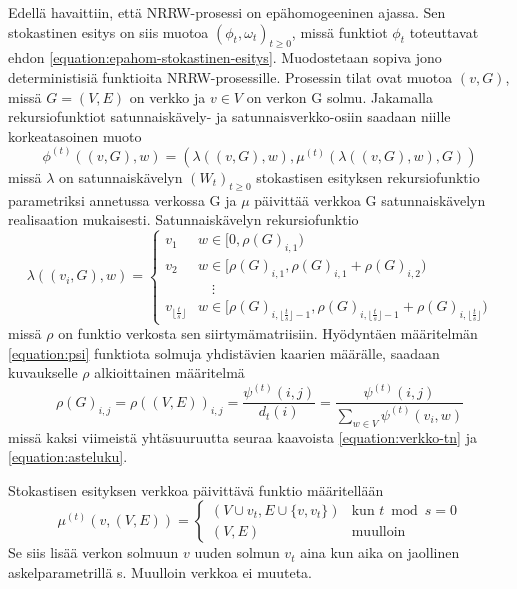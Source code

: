 \documentclass[finnish, 12pt, a4paper, sci, utf8, pdfa]{aaltothesis}
\begin{document}
Edellä havaittiin, että NRRW-prosessi on epähomogeeninen ajassa. Sen stokastinen esitys on siis muotoa \( (\phi_{t}, \omega_{t})_{t \geq 0} \), missä funktiot \( \phi_{t} \) toteuttavat ehdon \ref{equation:epahom-stokastinen-esitys}. Muodostetaan sopiva jono deterministisiä funktioita NRRW-prosessille. Prosessin tilat ovat muotoa \( (v, G) \), missä \( G = (V, E) \) on verkko ja \( v \in V \) on verkon G solmu. Jakamalla rekursiofunktiot satunnaiskävely- ja satunnaisverkko-osiin saadaan niille korkeatasoinen muoto
\begin{equation}
   \phi^{(t)} \left( (v, G), w \right) = \left( \lambda\left( (v, G), w \right), \mu^{(t)} \left( \lambda\left( (v, G), w \right), G \right) \right)
\end{equation}
missä \( \lambda \) on satunnaiskävelyn \( (W_{t})_{t \geq 0} \) stokastisen esityksen rekursiofunktio parametriksi annetussa verkossa G ja \( \mu \) päivittää verkkoa G satunnaiskävelyn realisaation mukaisesti. Satunnaiskävelyn rekursiofunktio
\begin{equation}
   \lambda \left( (v_{i}, G), w \right) = 
   \begin{cases}
      v_{1} & w \in [0, \rho(G)_{i,1}) \\
      v_{2} & w \in [\rho(G)_{i,1}, \rho(G)_{i,1} + \rho(G)_{i,2}) \\
            & \quad \vdots \\
      v_{\lfloor \frac{t}{s} \rfloor} & w \in [\rho(G)_{i,\lfloor \frac{t}{s} \rfloor - 1}, \rho(G)_{i,\lfloor \frac{t}{s} \rfloor - 1} + \rho(G)_{i,\lfloor \frac{t}{s} \rfloor}) 
   \end{cases}
\end{equation}
missä \( \rho \) on funktio verkosta sen siirtymämatriisiin. Hyödyntäen määritelmän \ref{equation:psi} funktiota solmuja yhdistävien kaarien määrälle, saadaan kuvaukselle \( \rho \) alkioittainen määritelmä
\begin{equation}
   \rho(G)_{i,j} = \rho\left( (V, E) \right)_{i,j} = \frac{\psi^{(t)}(i, j)}{d_{t}(i)} = \frac{\psi^{(t)}(i, j)}{\sum_{w \in V} \psi^{(t)}(v_{i}, w)}
\end{equation}
missä kaksi viimeistä yhtäsuuruutta seuraa kaavoista \ref{equation:verkko-tn} ja \ref{equation:asteluku}.

Stokastisen esityksen verkkoa päivittävä funktio määritellään
\begin{equation}
   \mu^{(t)} \left( v, (V, E) \right) =
   \begin{cases}
      \left( V \cup {v_{t}}, E \cup \{ v, v_{t} \} \right) & \text{kun } t \bmod s = 0 \\
      \left( V, E \right) & \text{muulloin}
   \end{cases}
\end{equation}
Se siis lisää verkon solmuun \( v \) uuden solmun \( v_{t} \) aina kun aika on jaollinen askelparametrillä s. Muulloin verkkoa ei muuteta.
\end{document}
